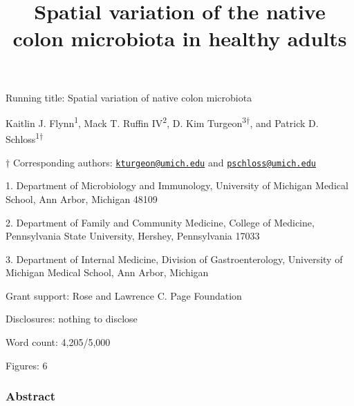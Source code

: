\documentclass[12pt,]{article}
\title{Spatial variation of the native colon microbiota in healthy adults}
\author{}
\date{}
\begin{document}
\maketitle

\vspace{8mm}

Running title: Spatial variation of native colon microbiota

\vspace{8mm}

Kaitlin J. Flynn\textsuperscript{1}, Mack T. Ruffin
IV\textsuperscript{2}, D. Kim Turgeon\textsuperscript{3\(\dagger\)}, and
Patrick D. Schloss\textsuperscript{1\(\dagger\)}

\vspace{8mm}

\(\dagger\) Corresponding authors:
\href{mailto:kturgeon@umich.edu}{\nolinkurl{kturgeon@umich.edu}} and
\href{mailto:pschloss@umich.edu}{\nolinkurl{pschloss@umich.edu}}

1. Department of Microbiology and Immunology, University of Michigan
Medical School, Ann Arbor, Michigan 48109

2. Department of Family and Community Medicine, College of Medicine,
Pennsylvania State University, Hershey, Pennsylvania 17033

3. Department of Internal Medicine, Division of Gastroenterology,
University of Michigan Medical School, Ann Arbor, Michigan

Grant support: Rose and Lawrence C. Page Foundation

Disclosures: nothing to disclose

Word count: 4,205/5,000

Figures: 6

\newpage

\subsubsection{Abstract}\label{abstract}
\end{document}
